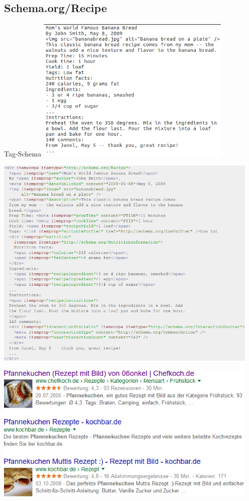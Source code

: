 \documentclass[12pt]{beamer}
\newcommand{\myCite}[1]{{\scriptsize\parencite{#1}}}
\begin{document}
\subsection{Schema.org/Recipe}
\begin{frame}{Tag-Schema}
	\includegraphics[width=0.7\textwidth]{Images/schemaRecipeWithoutMarkup} \\
	\myCite{schemaOrg}
\end{frame}
	
\begin{frame}{}
	\includegraphics[width=0.95\textwidth]{Images/schemaRecipeWithMarkup} \\
	\myCite{schemaOrg}
\end{frame}

\begin{frame}{}
	\includegraphics[width=0.95\textwidth]{Images/googleEnrichedSearchResult}
\end{frame}
\end{document}
